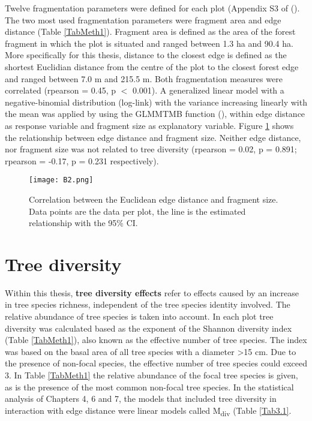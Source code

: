 \documentclass[b5paper,10pt]{book} %
\begin{document}
	Twelve fragmentation parameters were defined for each plot (Appendix S3 of (\citealt{Hertzog2019}). The two most used fragmentation parameters were fragment area and edge distance (Table \ref{TabMeth1}). Fragment area is defined as the area of the forest fragment in which the plot is situated and ranged between 1.3 ha and 90.4 ha. More specifically for this thesis, distance to the closest edge is defined as the shortest Euclidian distance from the centre of the plot to the closest forest edge and ranged between 7.0 m and 215.5 m. Both fragmentation measures were correlated (rpearson = 0.45, p $<$ 0.001). A generalized linear model with a negative-binomial distribution (log-link) with the variance increasing linearly with the mean was applied by using the GLMMTMB function (\citealt{Brooks2017}), within edge distance as response variable and fragment size as explanatory variable. Figure \ref{FigB.2} shows the relationship between edge distance and fragment size. Neither edge distance, nor fragment size was not related to tree diversity (rpearson = 0.02, p = 0.891; rpearson = -0.17, p = 0.231  respectively).

	\begin{figure}[h]
		\begin{center}
			\texttt{[image: B2.png]}
		\end{center}
			\caption{Correlation between the Euclidean edge distance and fragment size. Data points are the data per plot, the line is the estimated relationship with the 95\% CI. \label{FigB.2}}
	\end{figure}

	\section{Tree diversity}

	Within this thesis, \textbf{tree diversity effects} refer to effects caused by an increase in tree species richness, independent of the tree species identity involved. The relative abundance of tree species is taken into account. In each plot tree diversity was calculated based as the exponent of the Shannon diversity index (Table \ref{TabMeth1}), also known as the effective number of tree species. The index was based on the basal area of all tree species with a diameter \textgreater 15 cm. Due to the presence of non-focal species, the effective number of tree species could exceed 3. In Table \ref{TabMeth1} the relative abundance of the focal tree species is given, as is the presence of the most common non-focal tree species. In the statistical analysis of Chapters 4, 6 and 7, the models that included tree diversity in interaction with edge distance were linear models called M\textsubscript{div} (Table \ref{Tab3.1}.
\end{document}
